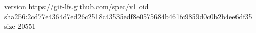 version https://git-lfs.github.com/spec/v1
oid sha256:2cd77e4364d7ed26c2518c43535edf8e0575684b461fc9859d0c0b2b4ee6df35
size 20551
